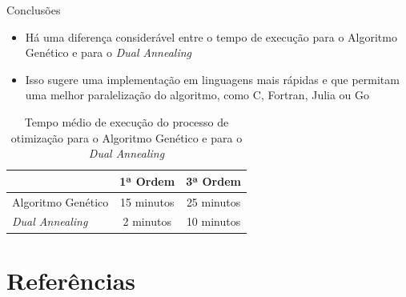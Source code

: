 \begin{frame}{Conclusões}
  \begin{itemize}
    \item Há uma diferença considerável entre o tempo de execução para o
          Algoritmo Genético e para o \textit{Dual Annealing}
    \item Isso sugere uma implementação em linguagens mais rápidas e que
          permitam uma melhor paralelização do algoritmo, como C, Fortran, Julia ou Go
  \end{itemize}
  \begin{table}
    \centering
    \begin{tabular}{lcc}
      \toprule
                              & 1ª Ordem   & 3ª Ordem   \\
      \midrule
      Algoritmo Genético      & 15 minutos & 25 minutos \\
      \textit{Dual Annealing} & 2 minutos  & 10 minutos \\
      \bottomrule
    \end{tabular}
    \caption{
      Tempo médio de execução do processo de otimização para o Algoritmo
      Genético e para o \textit{Dual Annealing}
    }
  \end{table}
\end{frame}

\section{Referências}

\nocite{dias2016article}
\nocite{dias2016tmdc}
\nocite{kolobov2016tmdc}


